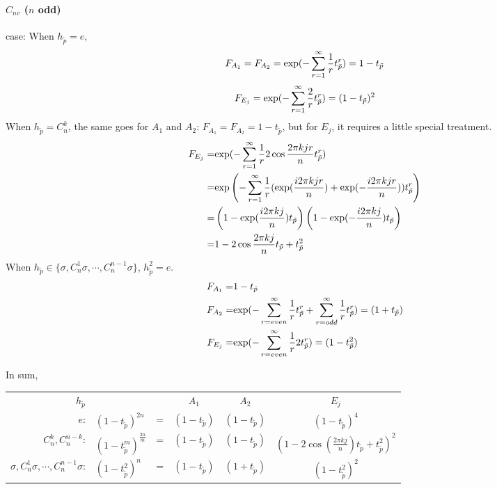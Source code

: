 \begin{description}
\paragraph{$C_{nv}$ ($n$ odd)} case:
When $h_{\tilde p}=e$,
\[
F_{A_1}=F_{A_2}={\rm exp} (-\sum_{r=1}^\infty {1 \over r}t_{\tilde{p}}^{r} )
=1-t_{\tilde p}
\]
\[
F_{E_j}={\rm exp} (-\sum_{r=1}^\infty {2 \over r}t_{\tilde{p}}^{r} )
=(1-t_{\tilde p})^2
\]
When $h_{\tilde p}=C_n^k$, the same goes for $A_1$ and $A_2$:
$F_{A_1}=F_{A_2}=1-t_{\tilde p}$, but for $E_j$, it requires a little
special treatment.
\begin{align*}
F_{E_j}= & {\rm exp} (-\sum_{r=1}^\infty {1 \over r}2\cos\frac{2\pi kjr}{n}
t_{\tilde{p}}^{r} ) \\
= & {\rm exp} \left(-\sum_{r=1}^\infty {1 \over r}(\exp(\frac{i2\pi
kjr}{n})+\exp(-\frac{i2\pi kjr}{n}))t_{\tilde{p}}^{r} \right) \\
= & \left(1-\exp(\frac{i2\pi kj}{n})t_{\tilde p} \right)
\left(1-\exp(-\frac{i2\pi kj}{n})t_{\tilde p} \right) \\
= & 1-2\cos\frac{2\pi kj}{n}t_{\tilde p}+t_{\tilde p}^2
\end{align*}
When $h_{\tilde p}\in \{\sigma,C_n^1\sigma,\cdots,C_n^{n-1}\sigma\}$,
$h_{\tilde p}^2=e$.
\begin{align*}
F_{A_1}= &1-t_{\tilde p} \\
F_{A_2}= &{\rm exp} (-\sum_{r=even}^\infty {1 \over r}t_{\tilde{p}}^{r}
+\sum_{r=odd}^\infty {1 \over r}t_{\tilde{p}}^{r} )
=(1+t_{\tilde p}) \\
F_{E_j}= &{\rm exp} (-\sum_{r=even}^\infty {1 \over r}2t_{\tilde{p}}^{r})
=(1-t_{\tilde p}^2)
\end{align*}

In sum,

\vskip 12pt
\begin{tabular}{rlcccc}

$h_{\tilde p}$ &  & &  $A_1$  &  $A_2$  &  $E_j$  \\
$e$:
& $(1-t_{\tilde p} )^{2n}$  &=&$(1-t_{\tilde p})$ & $(1-t_{\tilde p})$ &
$ (1-t_{\tilde p})^4 $ \\
$C_n^k,C_n^{n-k} $:
& $(1-t_{\tilde p}^m )^{\frac{2n}{m}}$ &=&  $(1-t_{\tilde p})$ & $(1-t_{\tilde p})$ &
$ (1-2\cos(\frac{2\pi kj}{n})t_{\tilde p}+t^{2}_{\tilde p})^2 $ \\
$\sigma,C_n^1\sigma,\cdots,C_n^{n-1}\sigma$:
& $(1-t_{\tilde p}^2 )^{n}$ &=&  $(1-t_{\tilde p})$ &                      $(1+t_{\tilde p})$ &$ (1-t_{\tilde p}^2)^2 $ \\
\end{tabular}
\vskip 12pt
\noindent


\end{description}
